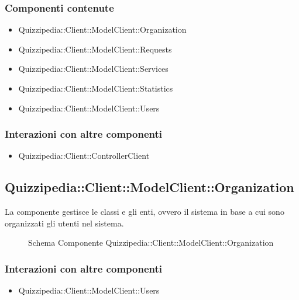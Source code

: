 \subsubsection{Componenti contenute}
\begin{itemize}
\item Quizzipedia::Client::ModelClient::Organization
\item Quizzipedia::Client::ModelClient::Requests
\item Quizzipedia::Client::ModelClient::Services
\item Quizzipedia::Client::ModelClient::Statistics
\item Quizzipedia::Client::ModelClient::Users
\end{itemize}
\subsubsection{Interazioni con altre componenti}
\begin{itemize}
\item Quizzipedia::Client::ControllerClient
\end{itemize}
\subsection{Quizzipedia::Client::ModelClient::Organization}
La componente gestisce le classi e gli enti, ovvero il sistema in base a cui sono organizzati gli utenti nel sistema.
\begin{figure}[H]
\centering
\noindent{}
\caption[Quizzipedia::Client::ModelClient::Organization]{Schema Componente Quizzipedia::Client::ModelClient::Organization}
\end{figure}
\subsubsection{Interazioni con altre componenti}
\begin{itemize}
\item Quizzipedia::Client::ModelClient::Users
\end{itemize}
